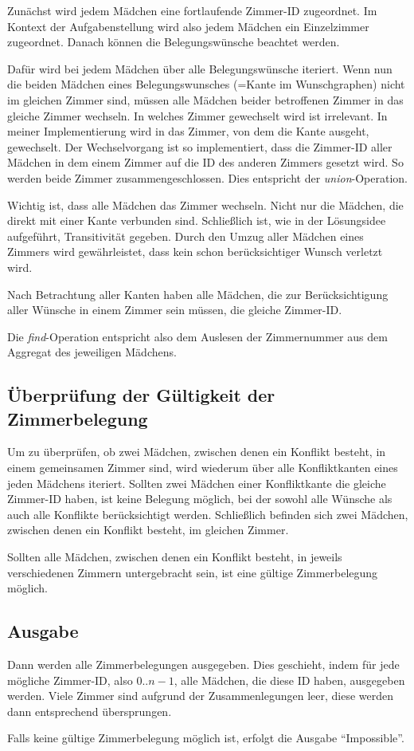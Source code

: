 Zunächst wird jedem Mädchen eine fortlaufende Zimmer-ID zugeordnet.
Im Kontext der Aufgabenstellung wird also jedem Mädchen ein Einzelzimmer zugeordnet.
Danach können die Belegungswünsche beachtet werden.

Dafür wird bei jedem Mädchen über alle Belegungswünsche iteriert.
Wenn nun die beiden Mädchen eines Belegungswunsches (=Kante im Wunschgraphen)
nicht im gleichen Zimmer sind, müssen alle Mädchen beider betroffenen Zimmer in das
gleiche Zimmer wechseln.
In welches Zimmer gewechselt wird ist irrelevant.
In meiner Implementierung wird in das Zimmer, von dem die Kante ausgeht, gewechselt.
Der Wechselvorgang ist so implementiert, dass die Zimmer-ID aller Mädchen in dem einem
Zimmer auf die ID des anderen Zimmers gesetzt wird. So werden beide Zimmer
zusammengeschlossen. Dies entspricht der \textit{union}-Operation.

Wichtig ist, dass alle Mädchen das Zimmer wechseln. Nicht nur die Mädchen,
die direkt mit einer Kante verbunden sind.
Schließlich ist, wie in der Lösungsidee aufgeführt, Transitivität gegeben.
Durch den Umzug aller Mädchen eines Zimmers wird gewährleistet,
dass kein schon berücksichtiger Wunsch verletzt wird.

Nach Betrachtung aller Kanten haben alle Mädchen,
die zur Berücksichtigung aller Wünsche in einem Zimmer sein müssen,
die gleiche Zimmer-ID.

Die \textit{find}-Operation entspricht also dem Auslesen der Zimmernummer aus dem Aggregat des jeweiligen Mädchens.

\subsection{Überprüfung der Gültigkeit der Zimmerbelegung}
Um zu überprüfen, ob zwei Mädchen, zwischen denen ein Konflikt besteht,
in einem gemeinsamen Zimmer sind,
wird wiederum über alle Konfliktkanten eines jeden Mädchens iteriert.
Sollten zwei Mädchen einer Konfliktkante die gleiche Zimmer-ID haben, ist keine Belegung möglich,
bei der sowohl alle Wünsche als auch alle Konflikte berücksichtigt werden.
Schließlich befinden sich zwei Mädchen, zwischen denen ein Konflikt besteht, im gleichen
Zimmer.

Sollten alle Mädchen, zwischen denen ein Konflikt besteht,
in jeweils verschiedenen Zimmern untergebracht sein,
ist eine gültige Zimmerbelegung möglich.

\subsection{Ausgabe}
Dann werden alle Zimmerbelegungen ausgegeben.
Dies geschieht, indem für jede mögliche Zimmer-ID, also \(0 .. n-1\),
alle Mädchen, die diese ID haben, ausgegeben werden.
Viele Zimmer sind aufgrund der Zusammenlegungen leer,
diese werden dann entsprechend übersprungen.

Falls keine gültige Zimmerbelegung möglich ist, erfolgt die Ausgabe "`Impossible"'.
